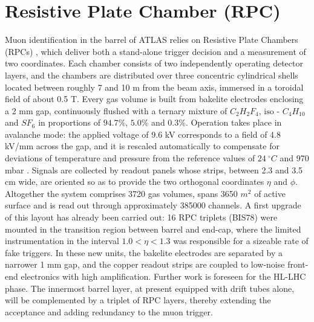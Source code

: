 \documentclass[11pt,a4paper,twoside,openright]{report}
\begin{document}
\section{Resistive Plate Chamber (RPC)}
Muon identification in the barrel of ATLAS relies on Resistive Plate Chambers (RPCs) \cite{ATLASRPCRun3}, which deliver both a stand-alone trigger decision and a measurement of two coordinates. Each chamber consists of two independently operating detector layers, and the chambers are distributed over three concentric cylindrical shells located between roughly 7 and 10 m from the beam axis, immersed in a toroidal field of about 0.5 T. Every gas volume is built from bakelite electrodes enclosing a 2 mm gap, continuously flushed with a ternary mixture of \(C_2H_2F_4\), \(\text{iso - }C_4H_{10}\) and \(SF_6\) in proportions of \(94.7\%\), \(5.0\%\) and \(0.3\%\). Operation takes place in avalanche mode: the applied voltage of 9.6 kV corresponds to a field of 4.8 kV/mm across the gap, and it is rescaled automatically to compensate for deviations of temperature and pressure from the reference values of \(24\ ^\circ C\) and 970 mbar \cite{GA}. Signals are collected by readout panels whose strips, between 2.3 and 3.5 cm wide, are oriented so as to provide the two orthogonal coordinates \(\eta\) and \(\phi\). Altogether the system comprises 3720 gas volumes, spans 3650 \(m^2\) of active surface and is read out through approximately 385000 channels. A first upgrade of this layout has already been carried out: 16 RPC triplets (BIS78) were mounted in the transition region between barrel and end-cap, where the limited instrumentation in the interval \(1.0 < \eta < 1.3\) was responsible for a sizeable rate of fake triggers. In these new units, the bakelite electrodes are separated by a narrower 1 mm gap, and the copper readout strips are coupled to low-noise front-end electronics with high amplification. Further work is foreseen for the HL-LHC phase. The innermost barrel layer, at present equipped with drift tubes alone, will be complemented by a triplet of RPC layers, thereby extending the acceptance and adding redundancy to the muon trigger.
\end{document}
